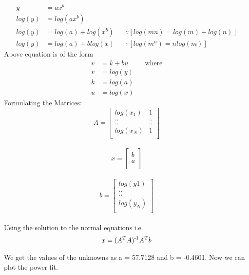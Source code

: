 \documentclass{article}
\begin{document}
\begin{align}
	y &= ax^b \\
	log( y ) &= log( ax^b )  \\
	log( y ) &= log( a ) + log( x^b ) && \because [ log(mn) = log(m) + log(n) ] \\
	log( y ) &= log( a ) + blog( x ) && \because [log(m^n) = n log( m ) ] 
\end{align}
Above equation is of the form
\begin{align}
	v &= k + bu && \text{where} \\
	v &= log(y) \\
	k &= log(a) \\
	u &= log(x)
 \end{align}
\noindent 
Formulating the Matrices: \\
\begin{equation}
A = 
	\begin{bmatrix}
		log(x_1) & 1 \\
		..   & ..  \\
		..   & ..  \\
		log(x_N) & 1 \\
	\end{bmatrix}
\end{equation}
\\
\begin{equation}
	x = 
	\begin{bmatrix}
	b \\
	a \\
	\end{bmatrix}
\end{equation}
\\
\begin{equation}
	b = 
	\begin{bmatrix}
	log(y1) \\
	.. \\
	.. \\
	log(y_N)\\
	\end{bmatrix}
\end{equation} \\

\noindent
Using the solution to the normal equations i.e. 
\begin{equation}
	x = (A^T A)\textsuperscript{-1}A^Tb
\end{equation}

\noindent We get the values of the unknowns as a = 57.7128 and b = -0.4601.  Now we can plot the power fit. 
\end{document}
